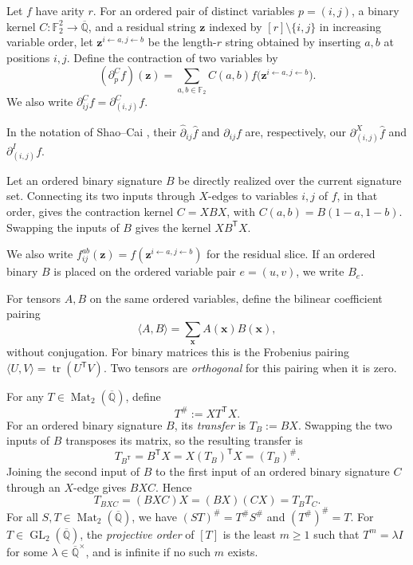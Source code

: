 \documentclass[11pt,letterpaper,onecolumn]{article}
\theoremstyle{plain}
\theoremstyle{definition}
\theoremstyle{remark}
\newcommand{\AlgNums}{\overline{\mathbb Q}}
\newcommand{\Ftwo}{\mathbb F_2}
\newcommand{\GL}{\operatorname{GL}}
\newcommand{\Mat}{\operatorname{Mat}}
\begin{document}
Let \(f\) have arity \(r\).  For an ordered pair of distinct variables
	\(p=(i,j)\), a binary kernel
	\(C:\Ftwo^2\to\AlgNums\), and a residual string \({\mathbf z}\) indexed by
	\([r]\setminus\{i,j\}\) in increasing variable order, let
	\({\mathbf z}^{i\leftarrow a,j\leftarrow b}\) be the length-\(r\) string obtained by
	inserting \(a,b\) at positions \(i,j\).  Define the contraction of two variables by
	\begin{equation*}
		(\partial_p^C f)({\mathbf z})
		=
		\sum_{a,b\in\Ftwo}C(a,b)
		f\bigl({\mathbf z}^{i\leftarrow a,j\leftarrow b}\bigr).
	\end{equation*}
We also write \(\partial_{ij}^C f=\partial_{(i,j)}^C f\).

In the notation of Shao--Cai
	\cite[full version, Section~2.4]{ShaoCai2020}, their
	\(\widehat\partial_{ij}\widehat f\) and \(\partial_{ij}f\) are,
	respectively, our \(\partial_{(i,j)}^X\widehat f\) and
	\(\partial_{(i,j)}^I f\).

Let an ordered binary signature \(B\) be directly realized over the current
signature set.  Connecting its two inputs through \(X\)-edges to variables
\(i,j\) of \(f\), in that order, gives the contraction kernel
\(C=XBX\), with \(C(a,b)=B(1-a,1-b)\).  Swapping the inputs of \(B\)
gives the kernel \(XB^{\mathsf T}X\).

We also write
	\(f_{ij}^{ab}({\mathbf z})=f({\mathbf z}^{i\leftarrow a,j\leftarrow b})\) for the residual
	slice.  If an ordered binary \(B\) is placed on the ordered variable pair
	\(e=(u,v)\), we write \(B_e\).

For tensors \(A,B\) on the same ordered variables, define the bilinear
coefficient pairing
\[
\langle A,B\rangle=\sum_{\mathbf x}A({\mathbf x})B({\mathbf x}),
\]
without conjugation. For binary matrices this is the Frobenius pairing
\(\langle U,V\rangle=\operatorname{tr}(U^{\mathsf T}V)\).
Two tensors are \emph{orthogonal} for this pairing when it is zero.

For any \(T\in\Mat_2(\AlgNums)\), define
\[
T^\#:=XT^{\mathsf T}X.
\]
For an ordered binary signature \(B\), its \emph{transfer} is \(T_B:=BX\).
Swapping the two inputs of \(B\) transposes its matrix, so the resulting
transfer is
\[
T_{B^{\mathsf T}}=B^{\mathsf T}X=X(T_B)^{\mathsf T}X=(T_B)^\#.
\]
Joining the second input of \(B\) to the first input of an ordered binary
signature \(C\) through an \(X\)-edge gives \(BXC\).  Hence
\[
T_{BXC}=(BXC)X=(BX)(CX)=T_BT_C.
\]
For all \(S,T\in\Mat_2(\AlgNums)\), we have
\((ST)^\#=T^\#S^\#\) and \((T^\#)^\#=T\).
For \(T\in\GL_2(\AlgNums)\), the \emph{projective order} of \([T]\)
is the least \(m\ge1\) such that \(T^m=\lambda I\) for some
\(\lambda\in\AlgNums^\times\), and is infinite if no such \(m\) exists.
\end{document}
